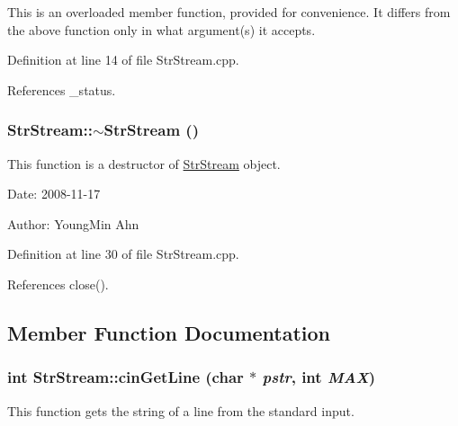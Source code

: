 This is an overloaded member function, provided for convenience. It differs from the above function only in what argument(s) it accepts. 

Definition at line 14 of file StrStream.cpp.

References \_\-status.\hypertarget{classkmaOrange_1_1StrStream_49071b602f5e14265b81c2280c8c56de}{
\subsubsection[{$\sim$StrStream}]{\setlength{\rightskip}{0pt plus 5cm}StrStream::$\sim$StrStream ()}}
\label{classkmaOrange_1_1StrStream_49071b602f5e14265b81c2280c8c56de}


This function is a destructor of \hyperlink{classkmaOrange_1_1StrStream}{StrStream} object. 

\begin{Desc}
\item[Date:]2008-11-17 \end{Desc}
\begin{Desc}
\item[Author:]YoungMin Ahn \end{Desc}


Definition at line 30 of file StrStream.cpp.

References close().

\subsection{Member Function Documentation}
\hypertarget{classkmaOrange_1_1StrStream_8f51bbfc68c5f84a299134f7c85097da}{
\subsubsection[{cinGetLine}]{\setlength{\rightskip}{0pt plus 5cm}int StrStream::cinGetLine (char $\ast$ {\em pstr}, \/  int {\em MAX})}}
\label{classkmaOrange_1_1StrStream_8f51bbfc68c5f84a299134f7c85097da}


This function gets the string of a line from the standard input. 

